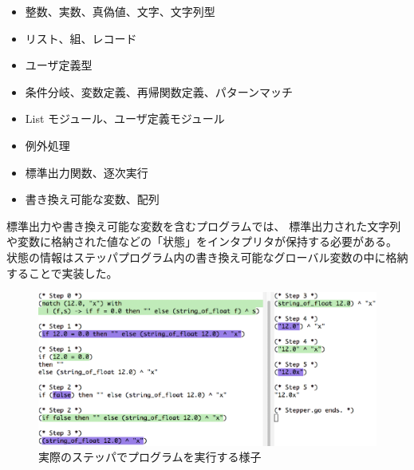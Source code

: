 \begin{itemize}
\item 整数、実数、真偽値、文字、文字列型
\item リスト、組、レコード
\item ユーザ定義型
\item 条件分岐、変数定義、再帰関数定義、パターンマッチ
\item List モジュール、ユーザ定義モジュール
\item 例外処理
\item 標準出力関数、逐次実行
\item 書き換え可能な変数、配列
\end{itemize}

標準出力や書き換え可能な変数を含むプログラムでは、
標準出力された文字列や変数に格納された値などの「状態」をインタプリタが保持する必要がある。
状態の情報はステッパプログラム内の書き換え可能なグローバル変数の中に格納することで実装した。

\begin{figure}
  \includegraphics[width=14cm]{6/longexample.eps}
  \caption{実際のステッパでプログラムを実行する様子}
  \label{figure:ocamlstep}
\end{figure}

